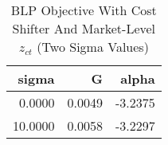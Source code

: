 \begin{table}[htbp]
    \centering
    \caption{BLP Objective With Cost Shifter And Market-Level $z_{ct}$ (Two Sigma Values)}
    \label{tab:q6_blp_costshifter_plus_z_G}
\toprule
\begin{tabular}{rrr}
\toprule
sigma & G & alpha \\
\midrule
\midrule
0.0000 & 0.0049 & -3.2375 \\
10.0000 & 0.0058 & -3.2297 \\
\bottomrule
\bottomrule
\end{tabular}

\end{table}
